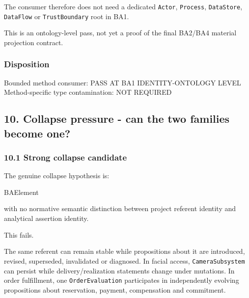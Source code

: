 \documentclass[
  10pt,
]{article}
\newenvironment{Shaded}{}{}
\newcommand{\NormalTok}[1]{#1}
\begin{document}
The consumer therefore does not need a dedicated \texttt{Actor},
\texttt{Process}, \texttt{DataStore}, \texttt{DataFlow} or
\texttt{TrustBoundary} root in BA1.

This is an ontology-level pass, not yet a proof of the final BA2/BA4
material projection contract.

\subsubsection{Disposition}\label{disposition-6}

\begin{Shaded}
\begin{Highlighting}[]
\NormalTok{Bounded method consumer: PASS AT BA1 IDENTITY{-}ONTOLOGY LEVEL}
\NormalTok{Method{-}specific type contamination: NOT REQUIRED}
\end{Highlighting}
\end{Shaded}

\subsection{10. Collapse pressure - can the two families become
one?}\label{collapse-pressure---can-the-two-families-become-one}

\subsubsection{10.1 Strong collapse
candidate}\label{strong-collapse-candidate}

The genuine collapse hypothesis is:

\begin{Shaded}
\begin{Highlighting}[]
\NormalTok{BAElement}
\end{Highlighting}
\end{Shaded}

with no normative semantic distinction between project referent identity
and analytical assertion identity.

This fails.

The same referent can remain stable while propositions about it are
introduced, revised, superseded, invalidated or diagnosed. In facial
access, \texttt{CameraSubsystem} can persist while delivery/realization
statements change under mutations. In order fulfillment, one
\texttt{OrderEvaluation} participates in independently evolving
propositions about reservation, payment, compensation and commitment.
\end{document}
